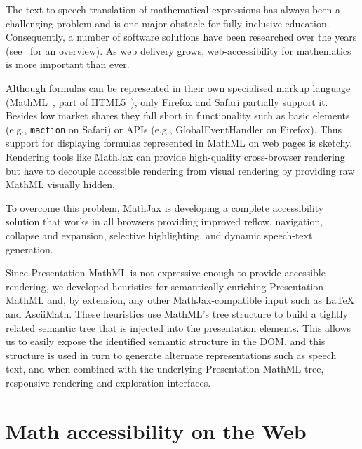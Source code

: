 \documentclass[conference]{IEEEtran}
\begin{document}
The text-to-speech translation of mathematical expressions has always been a
challenging problem and is one major obstacle for fully inclusive
education. Consequently, a number of software solutions have been researched
over the years (see~\cite{karshmer2007mathematics} for an overview). As web
delivery grows, web-accessibility for mathematics is more important than ever.

Although formulas can be represented in their own specialised markup language
(MathML~\cite{MathML3}, part of HTML5~\cite{HTML5}), only Firefox and Safari
partially support it. Besides low market shares \cite{browser_stats} they fall
short in functionality such as basic elements (e.g., \texttt{maction} on Safari)
or APIs (e.g., GlobalEventHandler on Firefox). Thus support for displaying
formulas represented in MathML on web pages is sketchy. Rendering tools like
MathJax \cite{MathJax2.5} can provide high-quality cross-browser rendering but
have to decouple accessible rendering from visual rendering by providing raw
MathML visually hidden.

To overcome this problem, MathJax is developing a complete accessibility 
solution that works in all browsers providing improved reflow, navigation, 
collapse and expansion, selective highlighting, and dynamic speech-text 
generation. 

Since Presentation MathML is not expressive enough to provide accessible
rendering, we developed heuristics for semantically enriching Presentation
MathML and, by extension, any other MathJax-compatible input such as {\LaTeX} 
and AsciiMath. These heuristics use MathML's tree structure to build a tightly
related semantic tree that is injected into the presentation elements. This
allows us to easily expose the identified semantic structure in the DOM, and
this structure is used in turn to generate alternate representations such as
speech text, and when combined with the underlying Presentation MathML tree,
responsive rendering and exploration interfaces.

\section{Math accessibility on the Web}
\label{sec:math}
\end{document}

